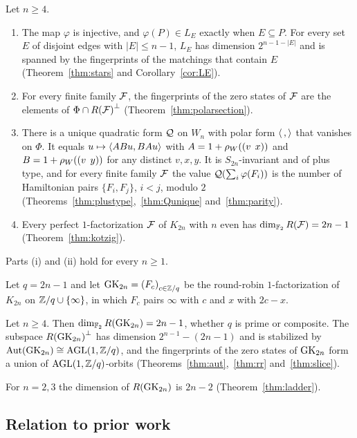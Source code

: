 \begin{mainthm}\label{mthm:D}
Let $n\ge4$.
\begin{enumerate}
\item The map $\varphi$ is injective, and $\varphi(P)\in L_E$ exactly when $E\subseteq P$. For every set $E$ of disjoint edges with $|E|\le n-1$, $L_E$ has dimension $2^{n-1-|E|}$ and is spanned by the fingerprints of the matchings that contain $E$ \textup{(Theorem~\ref{thm:stars} and Corollary~\ref{cor:LE})}.
\item For every finite family $\mathcal{F}$, the fingerprints of the zero states of $\mathcal{F}$ are the elements of $\Phi\cap{R(\mathcal{F})}^\perp$ \textup{(Theorem~\ref{thm:polarsection})}.
\item There is a unique quadratic form $\mathcal{Q}$ on $W_n$ with polar form $\langle\,,\rangle$ that vanishes on $\Phi$. It equals $u\mapsto\langle ABu,BAu\rangle$ with $A=1+\rho_W((v\;\,x))$ and $B=1+\rho_W((v\;\,y))$ for any distinct $v,x,y$. It is $S_{2n}$-invariant and of plus type, and for every finite family $\mathcal{F}$ the value $\mathcal{Q}(\sum_i\varphi(F_i))$ is the number of Hamiltonian pairs $\{F_i,F_j\}$, $i<j$, modulo $2$ \textup{(Theorems~\ref{thm:plustype},~\ref{thm:Qunique} and~\ref{thm:parity})}.
\item Every perfect $1$-factorization $\mathcal{F}$ of $K_{2n}$ with $n$ even has $\dim_{\mathbb{F}_2}R(\mathcal{F})=2n-1$ \textup{(Theorem~\ref{thm:kotzig})}.
\end{enumerate}
\end{mainthm}

Parts (i) and (ii) hold for every $n\ge1$.

Let $q=2n-1$ and let $\mathrm{GK}_{2n}={(F_c)}_{c\in\mathbb{Z}/q}$ be the round-robin $1$-factorization of $K_{2n}$ on $\mathbb{Z}/q\cup\{\infty\}$, in which $F_c$ pairs $\infty$ with $c$ and $x$ with $2c-x$.

\begin{mainthm}\label{mthm:E}
Let $n\ge4$. Then $\dim_{\mathbb{F}_2}R(\mathrm{GK}_{2n})=2n-1$, whether $q$ is prime or composite. The subspace ${R(\mathrm{GK}_{2n})}^\perp$ has dimension $2^{n-1}-(2n-1)$ and is stabilized by $\operatorname{Aut}(\mathrm{GK}_{2n})\cong\operatorname{AGL}(1,\mathbb{Z}/q)$, and the fingerprints of the zero states of $\mathrm{GK}_{2n}$ form a union of $\operatorname{AGL}(1,\mathbb{Z}/q)$-orbits \textup{(Theorems~\ref{thm:aut},~\ref{thm:rr} and~\ref{thm:slice})}.
\end{mainthm}

For $n=2,3$ the dimension of $R(\mathrm{GK}_{2n})$ is $2n-2$ (Theorem~\ref{thm:ladder}).

\subsection{Relation to prior work}\label{subsec:prior}

